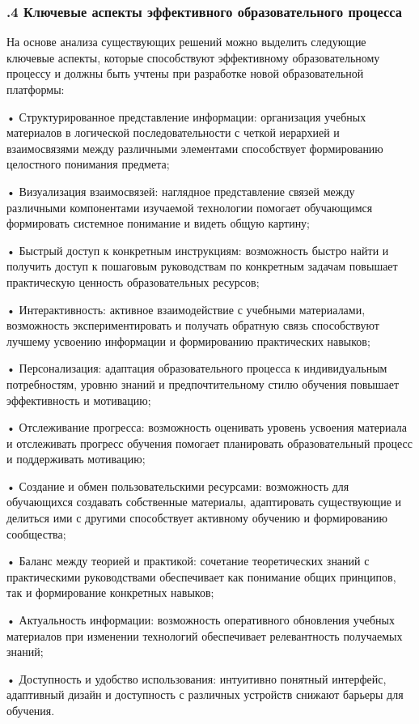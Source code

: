 \subtitlespace

\subsubsection*{ 
  \gostTitleFont
  .4 Ключевые аспекты эффективного образовательного процесса
} 

\subtitlespace

{\gostFont
  
  \par \redline На основе анализа существующих решений можно выделить следующие ключевые аспекты, которые способствуют эффективному образовательному процессу и должны быть учтены при разработке новой образовательной платформы:
  
  \par \redline • Структурированное представление информации: организация учебных материалов в логической последовательности с четкой иерархией и взаимосвязями между различными элементами способствует формированию целостного понимания предмета;
  \par \redline • Визуализация взаимосвязей: наглядное представление связей между различными компонентами изучаемой технологии помогает обучающимся формировать системное понимание и видеть общую картину;
  \par \redline • Быстрый доступ к конкретным инструкциям: возможность быстро найти и получить доступ к пошаговым руководствам по конкретным задачам повышает практическую ценность образовательных ресурсов;
  \par \redline • Интерактивность: активное взаимодействие с учебными материалами, возможность экспериментировать и получать обратную связь способствуют лучшему усвоению информации и формированию практических навыков;
  \par \redline • Персонализация: адаптация образовательного процесса к индивидуальным потребностям, уровню знаний и предпочтительному стилю обучения повышает эффективность и мотивацию;
  \par \redline • Отслеживание прогресса: возможность оценивать уровень усвоения материала и отслеживать прогресс обучения помогает планировать образовательный процесс и поддерживать мотивацию;
  \par \redline • Создание и обмен пользовательскими ресурсами: возможность для обучающихся создавать собственные материалы, адаптировать существующие и делиться ими с другими способствует активному обучению и формированию сообщества;
  \par \redline • Баланс между теорией и практикой: сочетание теоретических знаний с практическими руководствами обеспечивает как понимание общих принципов, так и формирование конкретных навыков;
  \par \redline • Актуальность информации: возможность оперативного обновления учебных материалов при изменении технологий обеспечивает релевантность получаемых знаний;
  \par \redline • Доступность и удобство использования: интуитивно понятный интерфейс, адаптивный дизайн и доступность с различных устройств снижают барьеры для обучения.

}

